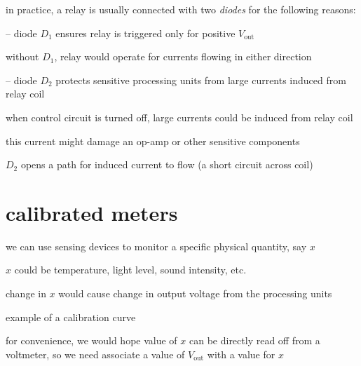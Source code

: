 \cmt in practice, a relay is usually connected with two \emph{diodes} for the following reasons:

\begin{compactitem}
	\item[--] diode $D_1$ ensures relay is triggered only for positive $V_\text{out}$
	
	without $D_1$, relay would operate for currents flowing in either direction
	
	\item[--] diode $D_2$ protects sensitive processing units from large currents induced from relay coil
	
	when control circuit is turned off, large currents could be induced from relay coil
	
	this current might damage an op-amp or other sensitive components
	
	$D_2$ opens a path for induced current to flow (a short circuit across coil)
\end{compactitem}





\section{calibrated meters}

we can use sensing devices to monitor a specific physical quantity, say $x$

$x$ could be temperature, light level, sound intensity, etc.

change in $x$ would cause change in output voltage from the processing units

\begin{marginfigure}
	\centering
	\vspace*{-15pt}
	\caption*{example of a calibration curve}
\end{marginfigure}

for convenience, we would hope value of $x$ can be directly read off from a voltmeter, so we need associate a value of $V_\text{out}$ with a value for $x$


